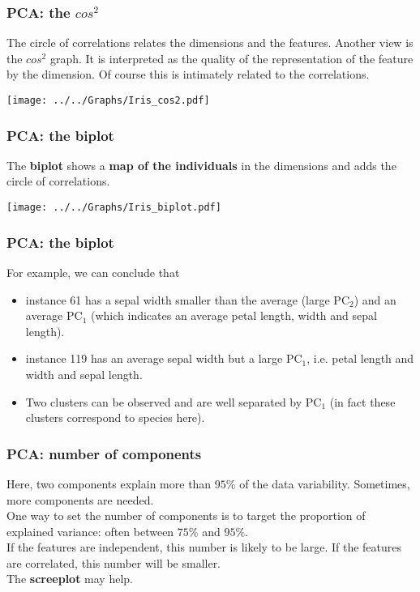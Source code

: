 \begin{frame}
\frametitle{PCA: the $cos^2$}
The circle of correlations relates the dimensions and the features. Another view is the {\bf $cos^2$} graph. It is interpreted as the quality of the representation of the feature by the dimension. Of course this is intimately related to the correlations.
\begin{center}
\texttt{[image: ../../Graphs/Iris\_cos2.pdf]}
\end{center}
\end{frame}
\begin{frame}
\frametitle{PCA: the biplot}
The {\bf biplot} shows a {\bf map of the individuals} in the dimensions and adds the circle of correlations. 
\begin{center}
\texttt{[image: ../../Graphs/Iris\_biplot.pdf]}
\end{center}
\end{frame}
\begin{frame}
\frametitle{PCA: the biplot}
For example, we can conclude that
\begin{itemize}
\item instance 61 has a sepal width smaller than the average (large PC$_2$) and an average PC$_1$ (which indicates an average petal length, width and sepal length).
\item instance 119 has an average sepal width but a large PC$_1$, i.e. petal length and width and sepal length.
\item Two clusters can be observed and are well separated by PC$_1$ (in fact these clusters correspond to species here).
\end{itemize}
\end{frame}
\begin{frame}
\frametitle{PCA: number of components}
Here, two components explain more than $95\%$ of the data variability. Sometimes, more components are needed.\\ 
\vspace{0.2cm}
One way to set the number of components is to target the proportion of explained variance: often between $75\%$ and $95\%$. \\
\vspace{0.2cm}
If the features are independent, this number is likely to be large. If the features are correlated, this number will be smaller.\\
\vspace{0.2cm}
The {\bf screeplot} may help.
\end{frame}

